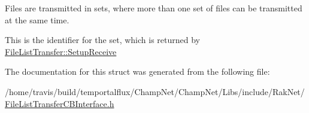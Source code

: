 Files are transmitted in sets, where more than one set of files can be transmitted at the same time. 

This is the identifier for the set, which is returned by \hyperlink{class_rak_net_1_1_file_list_transfer_afc31c7d166bfb3fb60944624e27ce388}{File\-List\-Transfer\-::\-Setup\-Receive} 

The documentation for this struct was generated from the following file\-:\begin{DoxyCompactItemize}
\item 
/home/travis/build/temportalflux/\-Champ\-Net/\-Champ\-Net/\-Libs/include/\-Rak\-Net/\hyperlink{_file_list_transfer_c_b_interface_8h}{File\-List\-Transfer\-C\-B\-Interface.\-h}\end{DoxyCompactItemize}
